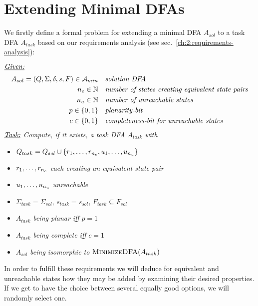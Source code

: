 
\chapter{Extending Minimal DFAs} \label{ch:4}

We firstly define a formal problem for extending a minimal DFA $A_{sol}$ to a task DFA $A_{task}$ based on our requirements analysis (see sec.~\ref{ch:2:requirements-analysis}):
\begin{definition}[ExtendMinDFA] $ $ \\
	$ $ \vspace{-0.cm} \\
	\noindent $\underline{\emph{Given:}}$
	\vspace{-0.2cm}
	\begin{align*}
	A_{sol} = (Q, \Sigma, \delta, s, F) \in {\mathcal{A}_{min}}\ \ \ & \emph{solution DFA} \\
	{n_e} \in \mathbb{N}\ \ \ & \emph{number of states creating equivalent state pairs} \\
	{n_u} \in \mathbb{N}\ \ \ & \emph{number of unreachable states} \\
	p \in \{0,1\}\ \ \ & \emph{planarity-bit} \\
	c \in \{0,1\}\ \ \ & \emph{completeness-bit for unreachable states}
	\end{align*}
	\noindent $\underline{\emph{Task:}}$ \emph{Compute, if it exists, a task DFA $A_{task}$ with}
	\begin{itemize}
		\item $Q_{task} = Q_{sol} \cup \{ r_1, \ldots, r_{n_e}, u_1, \ldots, u_{n_u} \}$
		\item $r_1, \ldots, r_{n_e}$ \emph{each creating an equivalent state pair\footnotemark}
		\item $u_1, \ldots, u_{n_u}$ \emph{unreachable}
		\item $\Sigma_{task} = \Sigma_{sol}$, $s_{task} = s_{sol}$, $F_{task} \subseteq F_{sol}$
		\item $A_{task}$ \emph{being planar iff} $p = 1$
		\item $A_{task}$ \emph{being complete iff} $c = 1$
		\item $A_{sol}$ \emph{being isomorphic to} $\textsc{MinimizeDFA}(A_{task})$
	\end{itemize}
\end{definition}
\noindent In order to fulfill these requirements we will deduce for equivalent and unreachable states how they may be added by examining their desired properties. If we get to have the choice between several equally good options, we will randomly select one.

